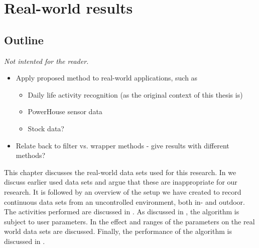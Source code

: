 
\chapter{Real-world results}

\label{Chapter6} %


\section{Outline}
\emph{Not intented for the reader.}
\begin{itemize}
  \item Apply proposed method to real-world applications, such as
    \begin{itemize}
      \item Daily life activity recognition (as the original context of this thesis is)
      \item PowerHouse sensor data
      \item Stock data?
    \end{itemize}
  \item Relate back to filter vs. wrapper methods - give results with different methods?
\end{itemize}

This chapter discusses the real-world data sets used for this research.
In  we discuss earlier used data sets and argue that these are inappropriate for our research.
It is followed by an overview of the setup we have created to record continuous data sets from an uncontrolled environment, both in- and outdoor.
The activities performed are discussed in .
As discussed in , the algorithm is subject to user parameters.
In  the effect and ranges of the parameters on the real world data sets are discussed.
Finally, the performance of the algorithm is discussed in .





